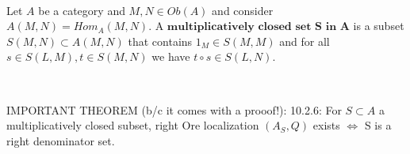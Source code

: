 \documentclass[12pt]{amsart}    %
\theoremstyle{definition}
\begin{document}
\

Let $A$ be a category and $M, N \in Ob(A)$ and consider $A(M,N) = Hom_A(M,N)$.  A $\textbf{multiplicatively closed set S in A}$ is a subset $S(M,N) \subset A(M,N)$ that contains $1_M \in S(M,M)$ and for all $s \in S(L,M), t \in S(M,N)$ we have $t \circ s \in S(L,N)$.  

\

IMPORTANT THEOREM (b/c it comes with a prooof!): 10.2.6: For $S \subset A$ a multiplicatively closed subset, right Ore localization $(A_S, Q)$ exists $\iff$ S is a right denominator set.  

\


\
\end{document}
